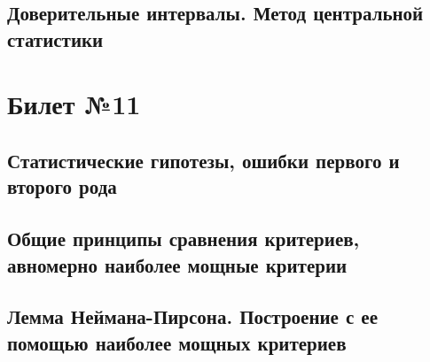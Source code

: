\documentclass[a4paper]{article}
\theoremstyle{plain}
\theoremstyle{remark}
\theoremstyle{definition}
\begin{document}
\subsection{Доверительные интервалы. Метод центральной статистики}

\section{Билет №11}
\subsection{Статистические гипотезы, ошибки первого и второго рода}
\subsection{Общие принципы сравнения критериев, авномерно наиболее мощные критерии}
\subsection{Лемма Неймана-Пирсона. Построение с ее помощью наиболее мощных критериев}
\end{document}
